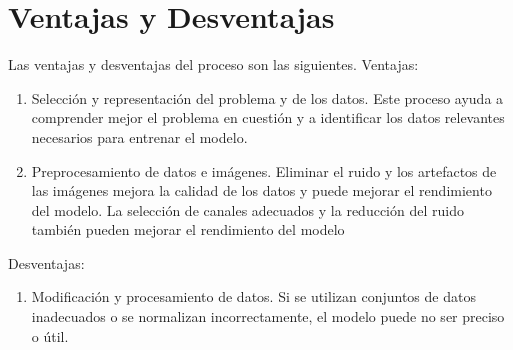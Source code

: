 \section{Ventajas y Desventajas}\label{sec:advantages_disadvantages}
Las ventajas y desventajas del proceso son las siguientes. 
Ventajas: 
\begin{enumerate}
    \item Selección y representación del problema y de los datos. 
    Este proceso ayuda a comprender mejor el problema en cuestión y a identificar los datos relevantes necesarios para entrenar el modelo.
    \item Preprocesamiento de datos e imágenes. 
    Eliminar el ruido y los artefactos de las imágenes mejora la calidad de los datos y puede mejorar el rendimiento del modelo. 
    La selección de canales adecuados y la reducción del ruido también pueden mejorar el rendimiento del modelo
\end{enumerate}  
Desventajas: 	
\begin{enumerate}
    \item Modificación y procesamiento de datos. Si se utilizan conjuntos de datos inadecuados o se normalizan incorrectamente, el modelo puede no ser preciso o útil.
\end{enumerate} 

